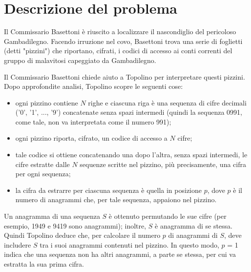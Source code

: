 \documentclass[a4paper,11pt]{article}
\begin{document}
\vspace{0.5cm}



\vspace{0.5cm}

\section*{Descrizione del problema}
   
Il Commissario Basettoni è riuscito a localizzare il
nascondiglio del pericoloso Gambadilegno. Facendo irruzione nel covo,
Basettoni trova una serie di foglietti (detti "pizzini") che
riportano, cifrati, i codici di accesso ai conti correnti del
gruppo di malavitosi capeggiato da Gambadilegno.

Il Commissario Basettoni chiede aiuto a Topolino per interpretare
questi pizzini. Dopo approfondite analisi, Topolino scopre le seguenti
cose:

\begin{itemize}
  
    \item ogni pizzino contiene $N$ righe e ciascuna riga è
una sequenza di cifre decimali ('0', '1', ..., '9') concatenate senza
spazi intermedi (quindi la sequenza 0991, come tale, non va
interpretata come il numero 991);

    \item ogni pizzino riporta, cifrato, un codice di accesso a $N$
cifre;

    \item tale codice si ottiene concatenando una dopo l'altra, senza spazi
intermedi, le cifre estratte dalle $N$ sequenze scritte nel
pizzino, più precisamente, una cifra per ogni sequenza;

    \item la cifra da estrarre per ciascuna sequenza è quella in
posizione $p$, dove $p$ è il numero di
anagrammi che, per tale sequenza, appaiono nel pizzino.

\end{itemize}

Un anagramma di una sequenza $S$ è ottenuto permutando
le sue cifre (per esempio, 1949 e 9419 sono anagrammi); inoltre,
$S$ è anagramma di se stessa.  Quindi Topolino deduce
che, per calcolare il numero $p$ di anagrammi di
$S$, deve includere $S$ tra i suoi anagrammi
contenuti nel pizzino. In questo modo, $p$ = 1 indica che una
sequenza non ha altri anagrammi, a parte se stessa, per cui va
estratta la sua prima cifra.
\end{document}
